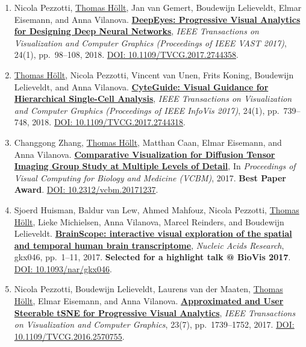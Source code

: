 \documentclass[10pt,a4paper,roman,final]{moderncv}
\newcommand*\highlightauthor[1]{\underline{#1}}
\begin{document}
\begin{enumerate}[leftmargin=0cm,start=2]
\item
Nicola Pezzotti, \highlightauthor{Thomas Höllt}, Jan van Gemert, Boudewijn Lelieveldt, Elmar Eisemann, and Anna Vilanova.
\href{https://www.thomashollt.com/publications/2017_vis_deepeyes/}{\textbf{DeepEyes: Progressive Visual Analytics for Designing Deep Neural Networks}},
\emph{IEEE Transactions on Visualization and Computer Graphics (Proceedings of IEEE VAST 2017)}, 24(1), pp.~98--108,
2018.
\href{https://doi.org/10.1109/TVCG.2017.2744358}{DOI: 10.1109/\allowbreak TVCG.2017.2744358}.


\item
\highlightauthor{Thomas Höllt}, Nicola Pezzotti, Vincent van Unen, Frits Koning, Boudewijn Lelieveldt, and Anna Vilanova.
\href{https://www.thomashollt.com/publications/2017_vis_cyteguide/}{\textbf{CyteGuide: Visual Guidance for Hierarchical Single-Cell Analysis}},
\emph{IEEE Transactions on Visualization and Computer Graphics (Proceedings of IEEE InfoVis 2017)}, 24(1), pp.~739--748,
2018.
\href{https://doi.org/10.1109/TVCG.2017.2744318}{DOI: 10.1109/\allowbreak TVCG.2017.2744318}.


\item
Changgong Zhang, \highlightauthor{Thomas Höllt}, Matthan Caan, Elmar Eisemann, and Anna Vilanova.
\href{https://www.thomashollt.com/publications/2017_vcbm_diftensgroup/}{\textbf{Comparative Visualization for Diffusion Tensor Imaging Group Study at Multiple Levels of Detail}},
In \emph{Proceedings of Visual Computing for Biology and Medicine (VCBM)},
2017.
\textbf{Best Paper Award}.
\href{https://doi.org/10.2312/vcbm.20171237}{DOI: 10.2312/\allowbreak vcbm.20171237}.


\item
Sjoerd Huisman, Baldur van Lew, Ahmed Mahfouz, Nicola Pezzotti, \highlightauthor{Thomas Höllt}, Lieke Michielsen, Anna Vilanova, Marcel Reinders, and Boudewijn Lelieveldt.
\href{https://www.thomashollt.com/publications/2017_nar_brainscope/}{\textbf{BrainScope: interactive visual exploration of the spatial and temporal human brain transcriptome}},
\emph{Nucleic Acids Research}, gkx046, pp.~1--11,
2017.
\textbf{Selected for a highlight talk @ BioVis 2017}.
\href{https://doi.org/10.1093/nar/gkx046}{DOI: 10.1093/\allowbreak nar/\allowbreak gkx046}.


\item
Nicola Pezzotti, Boudewijn Lelieveldt, Laurens van der Maaten, \highlightauthor{Thomas Höllt}, Elmar Eisemann, and Anna Vilanova.
\href{https://www.thomashollt.com/publications/2017_tvcg_atsne/}{\textbf{Approximated and User Steerable tSNE for Progressive Visual Analytics}},
\emph{IEEE Transactions on Visualization and Computer Graphics}, 23(7), pp.~1739--1752,
2017.
\href{https://doi.org/10.1109/TVCG.2016.2570755}{DOI: 10.1109/\allowbreak TVCG.2016.2570755}.



\end{enumerate}
\end{document}
